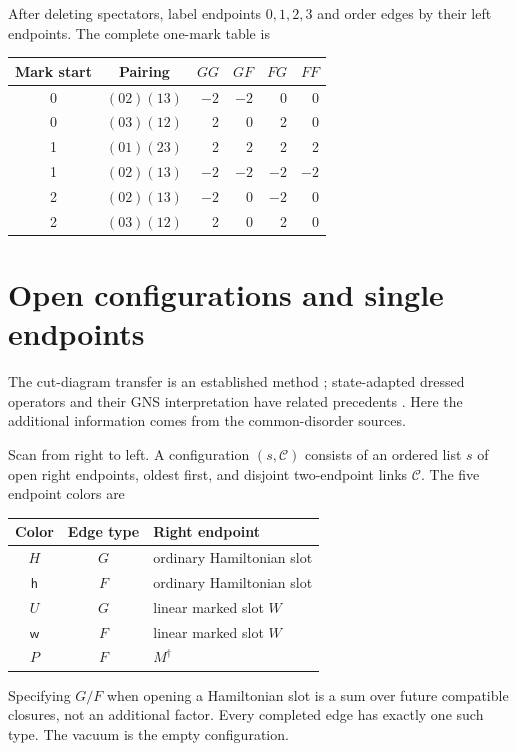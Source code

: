 \documentclass[11pt]{article}
\begin{document}
After deleting spectators, label endpoints $0,1,2,3$ and order edges
by their left endpoints. The complete one-mark table is
\begin{center}
\begin{tabular}{ccrrrr}\toprule
Mark start&Pairing&$GG$&$GF$&$FG$&$FF$\\\midrule
0&$(02)(13)$&$-2$&$-2$&0&0\\
0&$(03)(12)$&2&0&2&0\\
1&$(01)(23)$&2&2&2&2\\
1&$(02)(13)$&$-2$&$-2$&$-2$&$-2$\\
2&$(02)(13)$&$-2$&0&$-2$&0\\
2&$(03)(12)$&2&0&2&0\\\bottomrule
\end{tabular}
\end{center}

\newpage
\section{Open configurations and single endpoints}
The cut-diagram transfer is an established method
\cite[Sec.~2.3]{BINT}; state-adapted dressed operators and their GNS
interpretation have related precedents \cite[Secs.~3.2--4]{RX}.
Here the additional information comes from the common-disorder sources.

Scan from right to left. A configuration $(s,\mathcal C)$ consists of
an ordered list $s$ of open right endpoints, oldest first, and disjoint
two-endpoint links $\mathcal C$. The five endpoint colors are
\begin{center}
\begin{tabular}{ccl}\toprule
Color&Edge type&Right endpoint\\\midrule
$H$&$G$&ordinary Hamiltonian slot\\
$\mathsf h$&$F$&ordinary Hamiltonian slot\\
$U$&$G$&linear marked slot $W$\\
$\mathsf w$&$F$&linear marked slot $W$\\
$P$&$F$&$M^\dagger$\\\bottomrule
\end{tabular}
\end{center}
Specifying $G/F$ when opening a Hamiltonian slot is a sum over future
compatible closures, not an additional factor. Every completed edge
has exactly one such type. The vacuum is the empty configuration.
\end{document}
